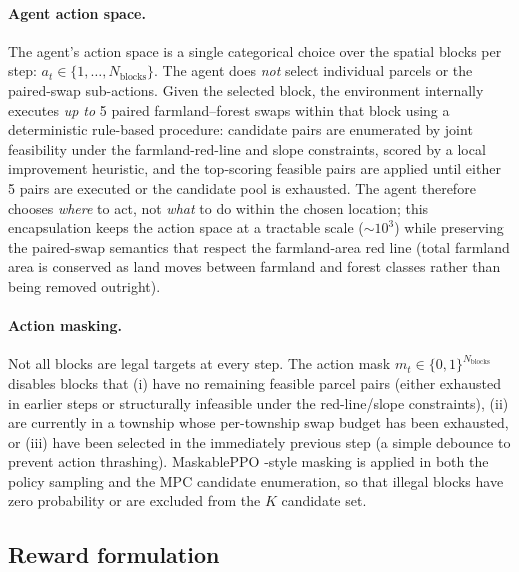 \documentclass[11pt]{article}
\begin{document}
\paragraph{Agent action space.}
The agent's action space is a single categorical choice over the spatial blocks per step: $a_t \in \{1, \ldots, N_{\text{blocks}}\}$. The agent does \emph{not} select individual parcels or the paired-swap sub-actions. Given the selected block, the environment internally executes \emph{up to} 5 paired farmland--forest swaps within that block using a deterministic rule-based procedure: candidate pairs are enumerated by joint feasibility under the farmland-red-line and slope constraints, scored by a local improvement heuristic, and the top-scoring feasible pairs are applied until either 5 pairs are executed or the candidate pool is exhausted. The agent therefore chooses \emph{where} to act, not \emph{what} to do within the chosen location; this encapsulation keeps the action space at a tractable scale ($\sim 10^3$) while preserving the paired-swap semantics that respect the farmland-area red line (total farmland area is conserved as land moves between farmland and forest classes rather than being removed outright).

\paragraph{Action masking.}
Not all blocks are legal targets at every step. The action mask $m_t \in \{0, 1\}^{N_{\text{blocks}}}$ disables blocks that (i) have no remaining feasible parcel pairs (either exhausted in earlier steps or structurally infeasible under the red-line/slope constraints), (ii) are currently in a township whose per-township swap budget has been exhausted, or (iii) have been selected in the immediately previous step (a simple debounce to prevent action thrashing). MaskablePPO \citep{ross2011reduction,schulman2017proximal,huang2022maskable}-style masking is applied in both the policy sampling and the MPC candidate enumeration, so that illegal blocks have zero probability or are excluded from the $K$ candidate set.

\subsection*{Reward formulation}\label{sec:methods-reward}
\end{document}
